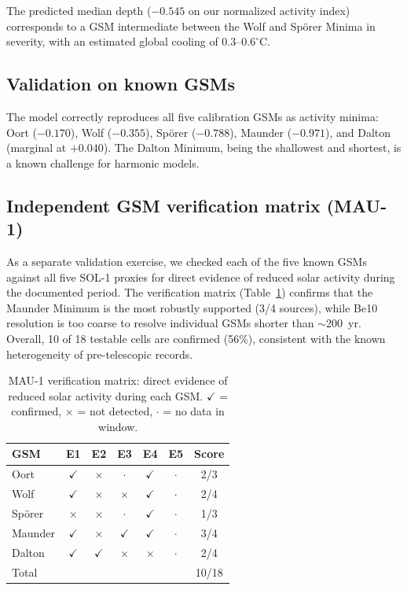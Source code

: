 \documentclass[twocolumn,preprintnumbers,amsmath,amssymb]{revtex4-2}
\begin{document}
The predicted median depth ($-0.545$ on our normalized activity index) corresponds to a GSM intermediate between the Wolf and Sp\"orer Minima in severity, with an estimated global cooling of $0.3$--$0.6^\circ$C.

\subsection{Validation on known GSMs}

The model correctly reproduces all five calibration GSMs as activity minima: Oort ($-0.170$), Wolf ($-0.355$), Sp\"orer ($-0.788$), Maunder ($-0.971$), and Dalton (marginal at $+0.040$). The Dalton Minimum, being the shallowest and shortest, is a known challenge for harmonic models.

\subsection{Independent GSM verification matrix (MAU-1)}

As a separate validation exercise, we checked each of the five known GSMs against all five SOL-1 proxies for direct evidence of reduced solar activity during the documented period. The verification matrix (Table~\ref{tab:mau1}) confirms that the Maunder Minimum is the most robustly supported (3/4 sources), while Be10 resolution is too coarse to resolve individual GSMs shorter than $\sim$200~yr. Overall, 10 of 18 testable cells are confirmed (56\%), consistent with the known heterogeneity of pre-telescopic records.

\begin{table}[h]
\caption{MAU-1 verification matrix: direct evidence of reduced solar activity during each GSM. $\checkmark$ = confirmed, $\times$ = not detected, $\cdot$ = no data in window.}
\label{tab:mau1}
\begin{ruledtabular}
\begin{tabular}{lcccccc}
GSM & E1 & E2 & E3 & E4 & E5 & Score \\
\hline
Oort & $\checkmark$ & $\times$ & $\cdot$ & $\checkmark$ & $\cdot$ & 2/3 \\
Wolf & $\checkmark$ & $\times$ & $\times$ & $\checkmark$ & $\cdot$ & 2/4 \\
Sp\"orer & $\times$ & $\times$ & $\cdot$ & $\checkmark$ & $\cdot$ & 1/3 \\
Maunder & $\checkmark$ & $\times$ & $\checkmark$ & $\checkmark$ & $\cdot$ & 3/4 \\
Dalton & $\checkmark$ & $\checkmark$ & $\times$ & $\times$ & $\cdot$ & 2/4 \\
\hline
\multicolumn{6}{l}{Total} & 10/18 \\
\end{tabular}
\end{ruledtabular}
\end{table}
\end{document}
